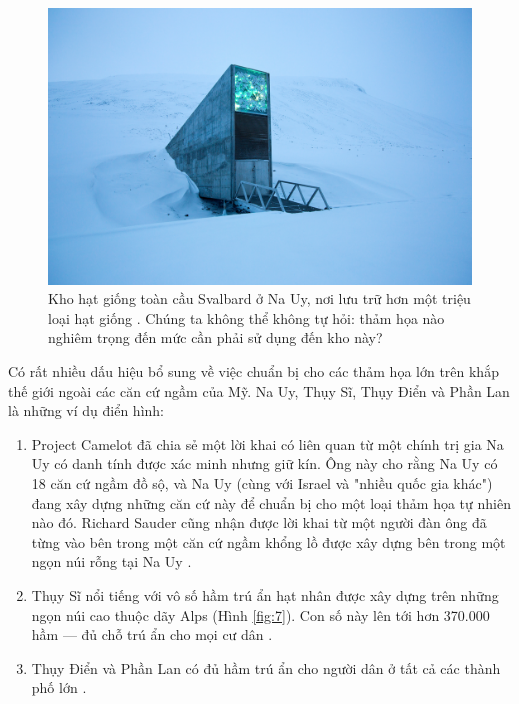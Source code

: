 \begin{figure}[t]
\begin{center}
   \includegraphics[width=1\linewidth]{svalbard.jpg}
\end{center}
   \caption{Kho hạt giống toàn cầu Svalbard ở Na Uy, nơi lưu trữ hơn một triệu loại hạt giống \cite{24}. Chúng ta không thể không tự hỏi: thảm họa nào nghiêm trọng đến mức cần phải sử dụng đến kho này?}
\label{fig:8}
\label{fig:onecol}
\end{figure}

Có rất nhiều dấu hiệu bổ sung về việc chuẩn bị cho các thảm họa lớn trên khắp thế giới ngoài các căn cứ ngầm của Mỹ. Na Uy, Thụy Sĩ, Thụy Điển và Phần Lan là những ví dụ điển hình:
\begin{flushleft}
\begin{enumerate}
    \item Project Camelot đã chia sẻ một lời khai có liên quan từ một chính trị gia Na Uy \cite{25,26} có danh tính được xác minh nhưng giữ kín. Ông này cho rằng Na Uy có 18 căn cứ ngầm đồ sộ, và Na Uy (cùng với Israel và "nhiều quốc gia khác") đang xây dựng những căn cứ này để chuẩn bị cho một loại thảm họa tự nhiên nào đó. Richard Sauder cũng nhận được lời khai từ một người đàn ông đã từng vào bên trong một căn cứ ngầm khổng lồ được xây dựng bên trong một ngọn núi rỗng tại Na Uy \cite{22}.
    \item Thụy Sĩ nổi tiếng với vô số hầm trú ẩn hạt nhân được xây dựng trên những ngọn núi cao thuộc dãy Alps (Hình \ref{fig:7}). Con số này lên tới hơn 370.000 hầm — đủ chỗ trú ẩn cho mọi cư dân \cite{27}.
    \item Thụy Điển và Phần Lan có đủ hầm trú ẩn cho người dân ở tất cả các thành phố lớn \cite{27}.
\end{enumerate}
\end{flushleft}

